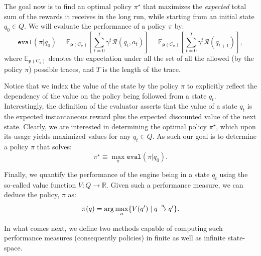 The goal now is to find an optimal policy $\pi^{\star}$ that maximizes the \emph{expected} total sum of the rewards it receives in the long run, while starting from an initial state $q_{0} \in Q$. We will evaluate the performance of a policy $\pi$ by:
\begin{equation}
\label{Eq:ValueOne}
\texttt{eval}({\pi}|q_{0}) = \mathbb{E}_{\bm{\rho}(C_\pi)} \left[\sum_{t=0}^{T} \gamma^{t}\mathcal{R}(q_{t},a_{t})\right]= \mathbb{E}_{\bm{\rho}(C_\pi)} \left[\sum_{t=0}^{T} \gamma^{t}\mathcal{R}(q_{t+1})\right],
\end{equation}
where  $\mathbb{E}_{\bm{\rho}(C_\pi)}$ denotes the expectation under all the set of all the allowed (by the policy $\pi$) possible traces, and $T$ is the length of the trace. 


Notice that we index the value of the state by the policy $\pi$ to explicitly reflect the dependency of the value on the policy being followed from a state $q_{t}$. Interestingly, the definition of the evaluator asserts that the value of a state $q_{t}$ is the expected instantaneous reward plus the expected discounted value of the next state. Clearly, we are interested in determining the optimal policy $\pi^{\star}$, which upon its usage yields maximized values for any $q_{t} \in Q$. As such our goal is to determine a policy $\pi$ that solves:
\begin{equation*}
\pi^{\star} \equiv \max_{\pi} \texttt{eval}({\pi}|q_{0}). 
\end{equation*}



Finally, we quantify the performance of the engine being in a state $q_{t}$ using the so-called value function $V: {Q} \rightarrow \mathbb{R}$. Given such a performance measure, we can deduce the policy, $\pi$ as: 
\begin{equation}
\label{Eq:Policy}
\pi(q) = \arg\max_{a} \{V(q') \mid q \goesto[a] q'\}.
\end{equation}

In what comes next, we define two methods capable of computing such performance measures (consequently policies) in finite as well as infinite state-space. 

